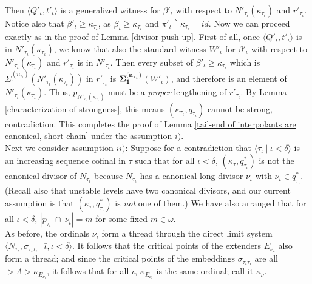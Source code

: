 \documentclass[12pt]{article}
\begin{document}
Then $\langle Q'_\iota , t'_\iota \rangle$ is a generalized witness for $\beta'_\iota$ with respect to $N'_{\tau_\iota} ( \kappa_{\tau_\iota})$ and $r'_{\tau_\iota}$.  Notice also that $\beta'_\iota \geq \kappa_{\tau_\iota}$, as $\beta_\iota \geq \kappa_{\tau_\iota}$ and $\pi'_\iota \restriction \kappa_{\tau_\iota} = id$.  Now we can proceed exactly as in the proof of Lemma \ref{divisor push-up}.  First of all, once $\langle Q'_\iota , t'_\iota \rangle$ is in $N'_{\tau_\iota} ( \kappa_{\tau_\iota})$, we know that also the standard witness $W'_\iota$ for $\beta'_\iota$ with respect to $N'_{\tau_\iota} ( \kappa_{\tau_\iota} )$ and $r'_{\tau_\iota}$ is in $N'_{\tau_\iota}$.  Then every subset of $\beta'_\iota \geq \kappa_{\tau_\iota}$ which is $\Sigma_1^{(n_{\tau_\iota})} ( N'_{\tau_\iota} ( \kappa_{\tau_\iota}))$ in $r'_{\tau_\iota}$ is $\bf{\Sigma}_1^{( n_{\tau_\iota})}$$( W'_\iota)$, and therefore is an element of $N'_{\tau_\iota} ( \kappa_{\tau_\iota} )$.  Thus, $p_{N'_{\tau_\iota} ( \kappa_{\tau_\iota})}$ must be a \textit{proper} lengthening of $r'_{\tau_\iota}$.  By Lemma \ref{characterization of strongness}, this means $(\kappa_{\tau_\iota} , q_{\tau_\iota} )$ cannot be strong, contradiction. This completes the proof of Lemma \ref{tail-end of interpolants are canonical, short chain} under the assumption $i)$.\\

Next we consider assumption $ii)$: Suppose for a contradiction that $\langle \tau_\iota \ | \ \iota < \delta \rangle$ is an increasing sequence cofinal in $\tau$ such that for all $\iota < \delta$, $( \kappa_\tau , q_{\tau_\iota}^*)$ is not the canonical divisor of $N_{\tau_\iota}$ because $N_{\tau_\iota}$ has a canonical long divisor $\nu_\iota$ with $\nu_\iota \in q_{\tau_\iota}^*$.  (Recall also that unstable levels have two canonical divisors, and our current assumption is that $( \kappa_\tau , q_{\tau_\iota}^*)$ is \textit{not} one of them.)  We have also arranged that for all $\iota < \delta$, $|p_{\tau_\iota} \ \cap \ \nu_\iota| = m$ for some fixed $m \in \omega$.\\

As before, the ordinals $\nu_\iota$ form a thread through the direct limit system $\langle N_{\tau_\iota} , \sigma_{\tau_{\bar{\iota}} \tau_\iota} \ | \ \bar{\iota}, \iota < \delta \rangle$.  It follows that the critical points of the extenders $E_{\nu_\iota}$ also form a thread; and since the critical points of the embeddings $\sigma_{\tau_{\bar{\iota}} \tau_\iota}$ are all $> \Lambda > \kappa_{E_{\nu_\iota}}$, it follows that for all $\iota$, $\kappa_{E_{\nu_\iota}}$ is the same ordinal; call it $\kappa_\nu$.\\
\end{document}
